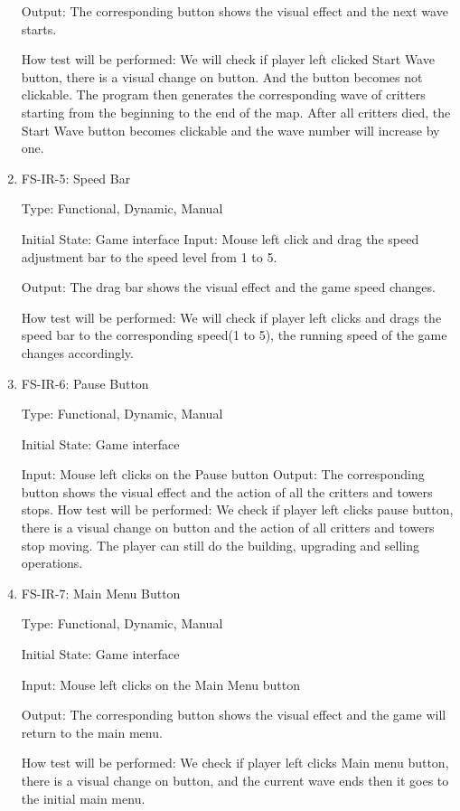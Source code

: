 \documentclass[12pt]{article}
\begin{document}
\begin{enumerate}
	Output: The corresponding button shows the visual effect and the next wave starts.
					
	How test will be performed: We will check if player left clicked Start Wave button, there is a visual change on button. And the button becomes not clickable. The program then generates the corresponding wave of critters starting from the beginning to the end of the map. After all critters died, the Start Wave button becomes clickable and the wave number will increase by one. 
					
					
	\item{FS-IR-5: Speed Bar}
					
	Type: Functional, Dynamic, Manual
					
	Initial State: Game interface
	\color{red}					
	Input: Mouse left click and drag the speed adjustment bar to the speed level from 1 to 5.
		
	Output: The drag bar shows the visual effect and the game speed changes.
					
    How test will be performed: We will check if player left clicks and drags the speed bar to the corresponding speed(1 to 5), the running speed of the game changes accordingly.
	\color{black}			

	\item{FS-IR-6: Pause Button}

	Type: Functional, Dynamic, Manual

	Initial State: Game interface

	Input:  Mouse left clicks on the Pause button
    \color{red}
	Output: The corresponding button shows the visual effect and the action of all the critters and towers stops.
	\color{black}
	How test will be performed: We check if player left clicks pause button, there is a visual change on button and the action of all critters and towers stop moving. The player can still do the building, upgrading and selling operations.
	
	
	
	\item{FS-IR-7: Main Menu Button}
	
    Type: Functional, Dynamic, Manual

	Initial State: Game interface

	Input: Mouse left clicks on the Main Menu button

	Output: The corresponding button shows the visual effect and the game will return to the main menu.

	How test will be performed: We check if player left clicks Main menu button, there is a visual change on button, and the current wave ends then it goes to the initial main menu.



\end{enumerate}
\end{document}
